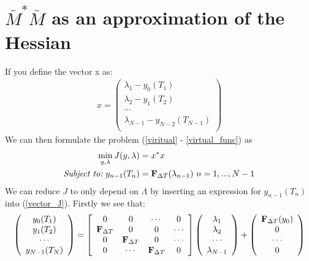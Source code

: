 \documentclass[11pt,a4paper]{article}
\begin{document}
\section{$\bar{M}^{*}\bar{M}$ as an approximation of the Hessian}
If you define the vector x as:
\begin{align}
x= \left( \begin{array}{c}  
   \lambda_1 - y_0(T_1) \\ 
   \lambda_2 - y_1(T_2) \\
   \cdots  \\
   \lambda_{N-1} -y_{N-2}(T_{N-1})  \\
   \end{array}  \right)
\end{align} 
We can then formulate the problem (\ref{viritual} - \ref{virtual_func}) as 
\begin{align}
\min_{y,\lambda} J(y,\lambda) &= x^*x \label{vector_J}\\ 
\textit{Subject to:} \ y_{n-1}(T_n) &= \bold{F}_{\Delta T}(\lambda_{n-1}) \ n =1,...,N-1 
\end{align}
We can reduce $J$ to only depend on $\Lambda$ by inserting an expression for $y_{n-1}(T_n)$ into (\ref{vector_J}). Firstly we see that:
\begin{align}
\left( \begin{array}{c}
   y_0(T_1) \\  
   y_1(T_2) \\ 
   \cdots  \\
   y_{N-1}(T_N)  \\
   \end{array}  \right)= 
   \left[ \begin{array}{cccc}  
   0 & 0 & \cdots & 0 \\ 
   \bold{F}_{\Delta T}&0 & 0  & \cdots \\
   0 &  \bold{F}_{\Delta T}&0 & \cdots \\
   0 &\cdots &\bold{F}_{\Delta T}& 0   \\
   \end{array}  \right]
   \left( \begin{array}{c}
   \lambda_1 \\  
   \lambda_2 \\ 
   \cdots  \\
   \lambda_{N-1}  \\
   \end{array}  \right) + 
   \left( \begin{array}{c}
   \bold{F}_{\Delta T}(y_0)\\  
   0\\ 
   \cdots  \\
   0  \\
   \end{array}  \right)
\end{align}
\end{document}
